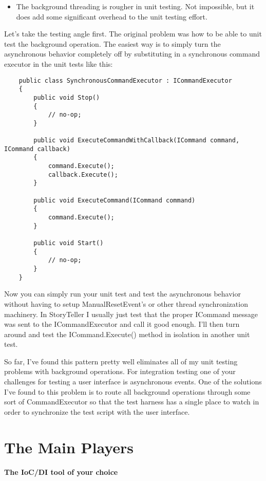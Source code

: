 \documentclass{article}
\begin{document}
{\begin{itemize}
 \item  The background threading is rougher in unit testing.  Not impossible, but it does add some significant overhead to the unit testing effort.  
 \end{itemize}
Let's take the testing angle first.  The original problem was how to be able to unit test the background operation.  The easiest way is to simply turn the asynchronous behavior completely off by substituting in a synchronous command executor in the unit tests like this:
\begin{lstlisting}
    public class SynchronousCommandExecutor : ICommandExecutor
    {
        public void Stop()
        {
            // no-op;
        }
		
        public void ExecuteCommandWithCallback(ICommand command, ICommand callback)
        {
            command.Execute();
            callback.Execute();
        }

        public void ExecuteCommand(ICommand command)
        {
            command.Execute();
        }

        public void Start()
        {
            // no-op;
        }
    }
\end{lstlisting}

Now you can simply run your unit test and test the asynchronous behavior without having to setup ManualResetEvent's or other thread synchronization machinery.  In StoryTeller I usually just test that the proper ICommand message was sent to the ICommandExecutor and call it good enough.  I'll then turn around and test the ICommand.Execute() method in isolation in another unit test.

So far, I've found this pattern pretty well eliminates all of my unit testing problems with background operations.  For integration testing one of your challenges for testing a user interface is asynchronous events.  One of the solutions I've found to this problem is to route all background operations through some sort of CommandExecutor so that the test harness has a single place to watch in order to synchronize the test script with the user interface.  

\section{ The Main Players } 
\Large {\textbf{The IoC/DI tool of your choice}}

}
\end{document}
